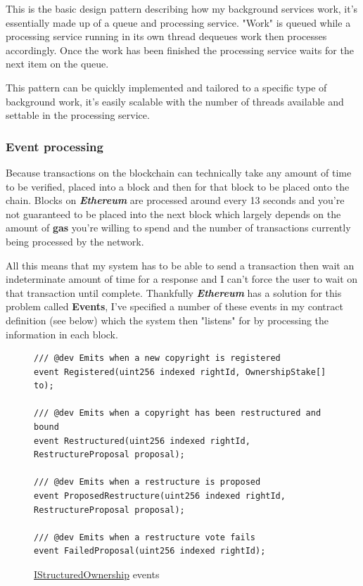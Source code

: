 \documentclass[12pt]{article}
\newcommand{\keyword}[1]{\textbf{\textit{#1}}}
\begin{document}
This is the basic design pattern describing how my background services work, it's essentially made up of a queue and processing service. "Work" is queued while a processing service running in its own thread dequeues work then processes accordingly. Once the work has been finished the processing service waits for the next item on the queue.

This pattern can be quickly implemented and tailored to a specific type of background work, it's easily scalable with the number of threads available and settable in the processing service.

\subsubsection{Event processing}

Because transactions on the blockchain can technically take any amount of time to be verified, placed into a block and then for that block to be placed onto the chain. Blocks on \keyword{Ethereum} are processed around every 13 seconds and you're not guaranteed to be placed into the next block which largely depends on the amount of \textbf{gas} you're willing to spend and the number of transactions currently being processed by the network.

All this means that my system has to be able to send a transaction then wait an indeterminate amount of time for a response and I can't force the user to wait on that transaction until complete. Thankfully \keyword{Ethereum} has a solution for this problem called \textbf{Events}, I've specified a number of these events in my contract definition (see below) which the system then "listens" for by processing the information in each block.

\begin{figure}[H]
\caption{\href{https://github.com/MrHarrisonBarker/CRPL/blob/main/CRPL.Contracts/contracts/IStructuredOwnership.sol}{IStructuredOwnership} events}
\begin{lstlisting}[language=Solidity]
/// @dev Emits when a new copyright is registered
event Registered(uint256 indexed rightId, OwnershipStake[] to);

/// @dev Emits when a copyright has been restructured and bound
event Restructured(uint256 indexed rightId, RestructureProposal proposal);

/// @dev Emits when a restructure is proposed
event ProposedRestructure(uint256 indexed rightId, RestructureProposal proposal);

/// @dev Emits when a restructure vote fails
event FailedProposal(uint256 indexed rightId);
\end{lstlisting}
\end{figure}
\end{document}
